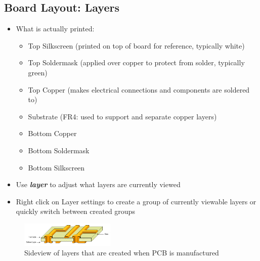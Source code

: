 \documentclass{article}
\begin{document}
\subsection{Board Layout: Layers}
\begin{itemize}
    \item What is actually printed:
    \begin{itemize}
        \item Top Silkscreen (printed on top of board for reference, typically white)
        \item Top Soldermask (applied over copper to protect from solder, typically green)
        \item Top Copper (makes electrical connections and components are soldered to)
        \item Substrate (FR4: used to support and separate copper layers)
        \item Bottom Copper
        \item Bottom Soldermask
        \item Bottom Silkscreen
    \end{itemize}
    \item Use \textit{\textbf{layer}} to adjust what layers are currently viewed
\end{itemize}
\begin{tcolorbox} [title=Tips \& Tricks]
    \begin{itemize}
        \item Right click on Layer settings to create a group of currently viewable layers or quickly switch between created groups
    \end{itemize}
\end{tcolorbox}

\begin{figure}[!h]
    \center
    \includegraphics[width=0.4\textwidth,height=0.4\textheight,keepaspectratio]{layers1}
    \caption {Sideview of layers that are created when PCB is manufactured}
    \label{img:layers}
\end{figure}
\end{document}
